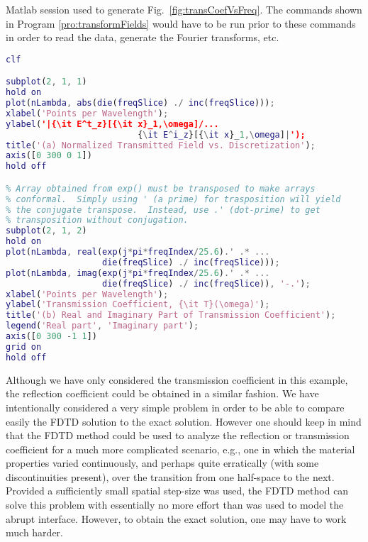 \begin{program}
Matlab session used to generate Fig.\
\ref{fig:transCoefVsFreq}.  The commands shown in Program
\ref{pro:transformFields} would have to be run prior to these
commands in order to read the data, generate the Fourier transforms, etc.
 \label{pro:transCoefficient}
\codemiddle
\begin{lstlisting}[language=Matlab]
clf

subplot(2, 1, 1)
hold on
plot(nLambda, abs(die(freqSlice) ./ inc(freqSlice)));
xlabel('Points per Wavelength');
ylabel('|{\it E^t_z}[{\it x}_1,\omega]/...
                          {\it E^i_z}[{\it x}_1,\omega]|');
title('(a) Normalized Transmitted Field vs. Discretization');
axis([0 300 0 1])
hold off

% Array obtained from exp() must be transposed to make arrays
% conformal.  Simply using ' (a prime) for trasposition will yield
% the conjugate transpose.  Instead, use .' (dot-prime) to get
% transposition without conjugation.
subplot(2, 1, 2)
hold on
plot(nLambda, real(exp(j*pi*freqIndex/25.6).' .* ...
                   die(freqSlice) ./ inc(freqSlice)));
plot(nLambda, imag(exp(j*pi*freqIndex/25.6).' .* ...
                   die(freqSlice) ./ inc(freqSlice)), '-.');
xlabel('Points per Wavelength');
ylabel('Transmission Coefficient, {\it T}(\omega)');
title('(b) Real and Imaginary Part of Transmission Coefficient');
legend('Real part', 'Imaginary part');
axis([0 300 -1 1])
grid on
hold off
\end{lstlisting}
\end{program}

Although we have only considered the transmission coefficient in this
example, the reflection coefficient could be obtained in a similar
fashion.  We have intentionally considered a very simple problem in
order to be able to compare easily the FDTD solution to the exact
solution.  However one should keep in mind that the FDTD method could
be used to analyze the reflection or transmission coefficient for a
much more complicated scenario, e.g., one in which the material
properties varied continuously, and perhaps quite erratically (with
some discontinuities present), over the transition from one half-space
to the next.  Provided a sufficiently small spatial step-size was
used, the FDTD method can solve this problem with essentially no more
effort than was used to model the abrupt interface.  However, to
obtain the exact solution, one may have to work much harder.
